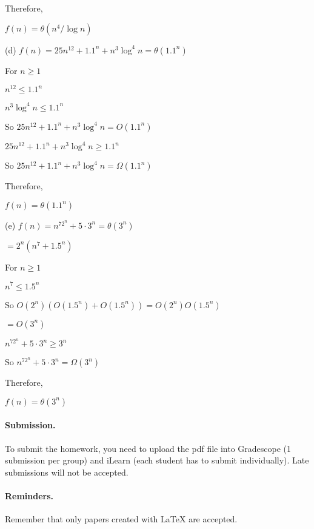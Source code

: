 \documentclass{article}
\begin{document}
\begin{solution}
\begin{description}
Therefore, 

$f(n) = \theta(n^4/\log n)$


\item{(d)} $f(n) = 25n^{12} +  1.1^n + n^3\log^4 n = \theta(1.1^n)$

For $ n \ge 1$

$n^{12} \le 1.1^n$

$n^3\log^4 n \le 1.1^n$

So $25n^{12} +  1.1^n + n^3\log^4 n = O(1.1^n)$

$25n^{12} +  1.1^n + n^3\log^4 n \ge 1.1^n$

So $25n^{12} +  1.1^n + n^3\log^4 n = \Omega(1.1^n)$

Therefore,

$f(n) = \theta(1.1^n)$

\item{(e)} $f(n) = n^72^n + 5\cdot 3^n = \theta(3^n)$

$ = 2^n(n^7 + 1.5^n)$

For $n \ge 1$

$n^7 \le 1.5^n$

So $O(2^n)(O(1.5^n) + O(1.5^n)) = O(2^n)O(1.5^n)$

$= O(3^n)$

$n^72^n + 5\cdot 3^n \ge 3^n$

So $n^72^n + 5\cdot 3^n = \Omega(3^n)$

Therefore,

$f(n) = \theta(3^n)$

\end{description}
\end{solution}


\vskip 0.1in
\paragraph{Submission.}
To submit the homework, you need to upload the pdf file into Gradescope (1 submission per group) and iLearn (each student has to submit individually). Late submissions will not be accepted.

\paragraph{Reminders.}
Remember that only papers created with {\LaTeX} are accepted. 
\end{document}
